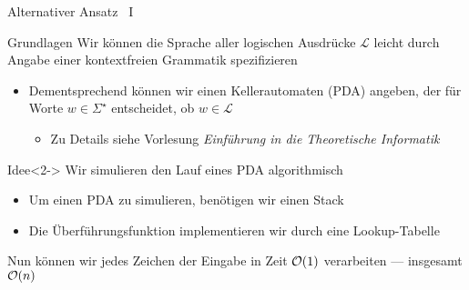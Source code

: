 
\begin{frame}{Alternativer Ansatz \, I}
\begin{block}{Grundlagen}
Wir k\"onnen die Sprache aller logischen Ausdr\"ucke $\mathcal{L}$ leicht durch Angabe einer \alert{kontextfreien Grammatik} spezifizieren
\begin{itemize}
    \item Dementsprechend k\"onnen wir einen \alert{Kellerautomaten} (PDA) angeben, der f\"ur Worte $w \in \Sigma^{\star}$ entscheidet, ob $w \in \mathcal{L}$
    \begin{itemize}
        \item Zu Details siehe Vorlesung \emph{Einf\"uhrung in die Theoretische Informatik}
    \end{itemize}
\end{itemize}
\end{block}

\begin{block}{Idee}<2->
Wir simulieren den Lauf eines PDA algorithmisch
\begin{itemize}
    \item Um einen PDA zu simulieren, ben\"otigen wir einen \alert{Stack}
    \item Die \alert{\"Uberf\"uhrungsfunktion} implementieren wir durch eine \alert{Lookup-Tabelle}
\end{itemize}

Nun k\"onnen wir jedes Zeichen der Eingabe in Zeit $\mathcal{O}(1)$ verarbeiten --- insgesamt $\mathcal{O}(n)$
\end{block}
\end{frame}


